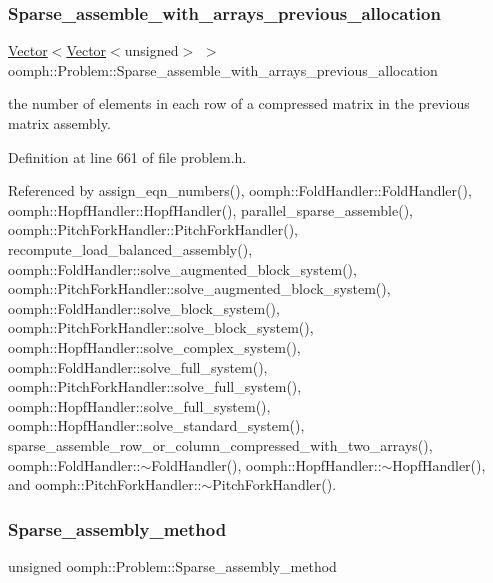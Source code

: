 \subsubsection{\texorpdfstring{Sparse\+\_\+assemble\+\_\+with\+\_\+arrays\+\_\+previous\+\_\+allocation}{Sparse\_assemble\_with\_arrays\_previous\_allocation}}
{\footnotesize\ttfamily \hyperlink{classoomph_1_1Vector}{Vector}$<$\hyperlink{classoomph_1_1Vector}{Vector}$<$unsigned$>$ $>$ oomph\+::\+Problem\+::\+Sparse\+\_\+assemble\+\_\+with\+\_\+arrays\+\_\+previous\+\_\+allocation\hspace{0.3cm}{\ttfamily [protected]}}



the number of elements in each row of a compressed matrix in the previous matrix assembly. 



Definition at line 661 of file problem.\+h.



Referenced by assign\+\_\+eqn\+\_\+numbers(), oomph\+::\+Fold\+Handler\+::\+Fold\+Handler(), oomph\+::\+Hopf\+Handler\+::\+Hopf\+Handler(), parallel\+\_\+sparse\+\_\+assemble(), oomph\+::\+Pitch\+Fork\+Handler\+::\+Pitch\+Fork\+Handler(), recompute\+\_\+load\+\_\+balanced\+\_\+assembly(), oomph\+::\+Fold\+Handler\+::solve\+\_\+augmented\+\_\+block\+\_\+system(), oomph\+::\+Pitch\+Fork\+Handler\+::solve\+\_\+augmented\+\_\+block\+\_\+system(), oomph\+::\+Fold\+Handler\+::solve\+\_\+block\+\_\+system(), oomph\+::\+Pitch\+Fork\+Handler\+::solve\+\_\+block\+\_\+system(), oomph\+::\+Hopf\+Handler\+::solve\+\_\+complex\+\_\+system(), oomph\+::\+Fold\+Handler\+::solve\+\_\+full\+\_\+system(), oomph\+::\+Pitch\+Fork\+Handler\+::solve\+\_\+full\+\_\+system(), oomph\+::\+Hopf\+Handler\+::solve\+\_\+full\+\_\+system(), oomph\+::\+Hopf\+Handler\+::solve\+\_\+standard\+\_\+system(), sparse\+\_\+assemble\+\_\+row\+\_\+or\+\_\+column\+\_\+compressed\+\_\+with\+\_\+two\+\_\+arrays(), oomph\+::\+Fold\+Handler\+::$\sim$\+Fold\+Handler(), oomph\+::\+Hopf\+Handler\+::$\sim$\+Hopf\+Handler(), and oomph\+::\+Pitch\+Fork\+Handler\+::$\sim$\+Pitch\+Fork\+Handler().

\mbox{\label{classoomph_1_1Problem_a447f9d42b248f6c394581ff1a0b02513}} 
\subsubsection{\texorpdfstring{Sparse\+\_\+assembly\+\_\+method}{Sparse\_assembly\_method}}
{\footnotesize\ttfamily unsigned oomph\+::\+Problem\+::\+Sparse\+\_\+assembly\+\_\+method\hspace{0.3cm}{\ttfamily [protected]}}



